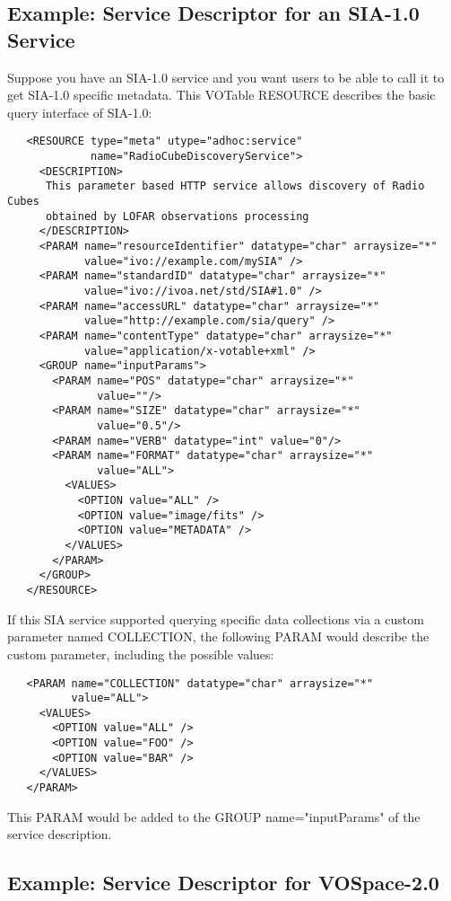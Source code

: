 \documentclass[11pt,a4paper]{ivoa}
\newcommand{\attval}[2]{#1={\allowbreak}{"}#2{"}}
\begin{document}
\subsection{Example: Service Descriptor for an SIA-1.0 Service}

Suppose you have an SIA-1.0 service and you want users to be able to
call it to get SIA-1.0 specific metadata. This VOTable RESOURCE describes
the basic query interface of SIA-1.0:
\begin{verbatim}
   <RESOURCE type="meta" utype="adhoc:service"
             name="RadioCubeDiscoveryService">
     <DESCRIPTION>
      This parameter based HTTP service allows discovery of Radio Cubes
      obtained by LOFAR observations processing
     </DESCRIPTION>
     <PARAM name="resourceIdentifier" datatype="char" arraysize="*"
            value="ivo://example.com/mySIA" />
     <PARAM name="standardID" datatype="char" arraysize="*"
            value="ivo://ivoa.net/std/SIA#1.0" />
     <PARAM name="accessURL" datatype="char" arraysize="*"
            value="http://example.com/sia/query" />
     <PARAM name="contentType" datatype="char" arraysize="*"
            value="application/x-votable+xml" />
     <GROUP name="inputParams">
       <PARAM name="POS" datatype="char" arraysize="*"
              value=""/>
       <PARAM name="SIZE" datatype="char" arraysize="*"
              value="0.5"/>
       <PARAM name="VERB" datatype="int" value="0"/>
       <PARAM name="FORMAT" datatype="char" arraysize="*"
              value="ALL">
         <VALUES>
           <OPTION value="ALL" />
           <OPTION value="image/fits" />
           <OPTION value="METADATA" />
         </VALUES>
       </PARAM>
     </GROUP>
   </RESOURCE>
\end{verbatim}

If this SIA service supported querying specific data collections via
a custom parameter named COLLECTION, the following PARAM would describe the
custom parameter, including the possible values:
\begin{verbatim}
   <PARAM name="COLLECTION" datatype="char" arraysize="*"
          value="ALL">
     <VALUES>
       <OPTION value="ALL" />
       <OPTION value="FOO" />
       <OPTION value="BAR" />
     </VALUES>
   </PARAM>
\end{verbatim}
This PARAM would be added to the GROUP \attval{name}{inputParams}
of the service description.


\subsection{Example: Service Descriptor for VOSpace-2.0}
\end{document}
